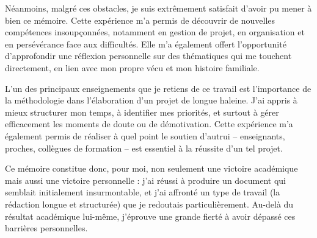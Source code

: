 \documentclass[12pt,a4paper]{report}
\begin{document}
Néanmoins, malgré ces obstacles, je suis extrêmement satisfait d’avoir pu mener à bien ce mémoire. Cette expérience m’a permis de découvrir de nouvelles compétences insoupçonnées, notamment en gestion de projet, en organisation et en persévérance face aux difficultés. Elle m’a également offert l’opportunité d’approfondir une réflexion personnelle sur des thématiques qui me touchent directement, en lien avec mon propre vécu et mon histoire familiale.

L’un des principaux enseignements que je retiens de ce travail est l’importance de la méthodologie dans l’élaboration d’un projet de longue haleine. J’ai appris à mieux structurer mon temps, à identifier mes priorités, et surtout à gérer efficacement les moments de doute ou de démotivation. Cette expérience m’a également permis de réaliser à quel point le soutien d’autrui – enseignants, proches, collègues de formation – est essentiel à la réussite d’un tel projet.

Ce mémoire constitue donc, pour moi, non seulement une victoire académique mais aussi une victoire personnelle : j’ai réussi à produire un document qui semblait initialement insurmontable, et j’ai affronté un type de travail (la rédaction longue et structurée) que je redoutais particulièrement. Au-delà du résultat académique lui-même, j’éprouve une grande fierté à avoir dépassé ces barrières personnelles.


\end{document}

